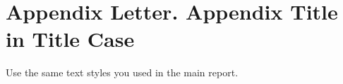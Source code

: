 \part{Appendix Letter. Appendix Title in Title Case}
Use the same text styles you used in the main report.